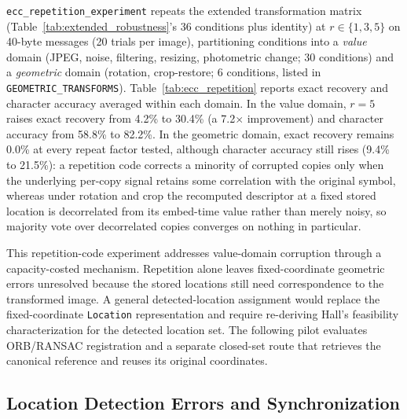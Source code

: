 \documentclass[preprint,12pt]{elsarticle}
\theoremstyle{plain}
\begin{document}
\texttt{ecc\_repetition\_experiment} repeats the extended transformation
matrix (Table~\ref{tab:extended_robustness}'s 36 conditions plus identity)
at $r \in \{1,3,5\}$ on 40-byte messages (20 trials per image), partitioning
conditions into a \emph{value} domain (JPEG, noise, filtering, resizing,
photometric change; 30 conditions) and a \emph{geometric} domain (rotation,
crop-restore; 6 conditions, listed in \texttt{GEOMETRIC\_TRANSFORMS}).
Table~\ref{tab:ecc_repetition} reports exact recovery and character accuracy
averaged within each domain. In the value domain, $r=5$ raises exact
recovery from 4.2\% to 30.4\% (a 7.2$\times$ improvement) and character
accuracy from 58.8\% to 82.2\%. In the geometric domain, exact recovery
remains 0.0\% at every repeat factor tested, although character accuracy
still rises (9.4\% to 21.5\%): a repetition code corrects a minority of
corrupted copies only when the underlying per-copy signal retains some
correlation with the original symbol, whereas under rotation and crop the
recomputed descriptor at a fixed stored location is decorrelated from its
embed-time value rather than merely noisy, so majority vote over
decorrelated copies converges on nothing in particular.

\begin{table}[!t]
\centering
\caption{Repetition-Code Error Correction: Exact Recovery and Character Accuracy by Domain (40 Bytes, 20 Trials per Image)}
\label{tab:ecc_repetition}
{\scriptsize\setlength{\tabcolsep}{2pt}}
\end{table}

This repetition-code experiment addresses value-domain corruption through a
capacity-costed mechanism. Repetition alone leaves fixed-coordinate geometric
errors unresolved because the stored locations still need correspondence to
the transformed image. A general detected-location assignment would replace
the fixed-coordinate \texttt{Location} representation and require
re-deriving Hall's feasibility characterization for the detected location
set. The following pilot evaluates ORB/RANSAC registration and a separate
closed-set route that retrieves the canonical reference and reuses its
original coordinates.

\subsection{Location Detection Errors and Synchronization}
\label{sec:detection_errors}
\end{document}
